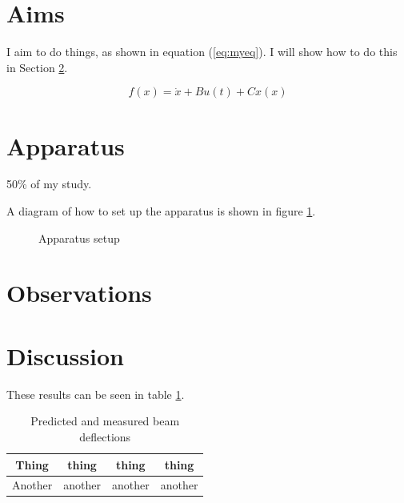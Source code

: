 \documentclass[a4paper]{report}
\begin{document}
  \section{Aims}
  I aim to do things, as shown in equation (\ref{eq:myeq}). I will show how to do this in Section \ref{app}.

  \begin{equation}
  \label{eq:myeq}
  f(x) = \dot{x} + B u(t) + C x(x)
  \end{equation}


  \section{Apparatus}
  \label{app}

  	50\% of my study.

      A diagram of how to set up the apparatus is shown in figure \ref{fig:app}.

      \begin{figure}
      \centering
      \caption{Apparatus setup}
      \label{fig:app}
      \end{figure}

  \section{Observations}


  \section{Discussion}

      These results can be seen in table \ref{fig:myt}.

      \begin{table}
      \begin{center}
      \caption{Predicted and measured beam deflections}
      \begin{tabular}{|c|c|c|c|}
  	\hline
  	Thing & thing & thing & thing \\
  	\hline
  	Another & another & another & another \\
  	\hline
      \end{tabular}
      \end{center}
      \label{fig:myt}
      \end{table}



\end{document}
